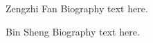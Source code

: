\documentclass[10pt,journal,compsoc]{IEEEtran}
\begin{document}
\begin{IEEEbiography}{Zengzhi Fan}
Biography text here.
\end{IEEEbiography}

\begin{IEEEbiographynophoto}{Bin Sheng}
Biography text here.
\end{IEEEbiographynophoto}








\end{document}
